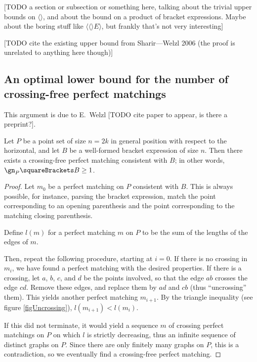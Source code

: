 \documentclass[10pt, a4paper, twoside]{basestyle}
\begin{document}
[TODO a section or subsection or something here, talking about the trivial upper bounds on $\langle\rangle$,
and about the bound on a product of bracket expressions. Maybe about the boring stuff like
$\langle\langle\rangle E \rangle$, but frankly that's not very interesting]

[TODO cite the existing upper bound from Sharir---Welzl 2006 (the proof is unrelated to anything here
though)]
\subsection{An optimal lower bound for the number of crossing-free perfect matchings}
This argument is due to E.~Welzl [TODO cite paper to appear, is there a preprint?].

\begin{theorem}
Let $P$ be a point set of size $n = 2k$ in general position with respect to the horizontal,
and let $B$ be a well-formed bracket expression of size $n$.
Then there exists a crossing-free perfect matching consistent with $B$; in other words,
$\gn_P\of B \geq 1$.
\begin{proof}
Let $m_0$ be a perfect matching on $P$ consistent with $B$. This is always possible, for instance,
parsing the bracket expression, match the point corresponding to an opening parenthesis
and the point corresponding to the matching closing parenthesis.

Define $l(m)$ for a perfect matching $m$ on $P$ to be the sum of the lengths of the edges of $m$.

Then, repeat the following procedure, starting at $i=0$.
If there is no crossing in $m_i$, we have found a perfect matching with the desired properties.
If there is a crossing, let $a$, $b$, $c$, and $d$ be the points involved, so that the edge
$ab$ crosses the edge $cd$. Remove these edges, and replace them by $ad$ and $cb$
(thus ``uncrossing'' them). This yields another perfect matching $m_{i+1}$. By the triangle
inequality (see figure \ref{figUncrossing}), $l(m_{i+1})<l(m_i)$.

If this did not terminate, it would yield a sequence $m$ of crossing perfect matchings on $P$ on
which $l$ is strictly decreasing, thus an infinite sequence of distinct graphs on $P$.
Since there are only finitely many graphs on $P$, this is a contradiction, so we eventually find a
crossing-free perfect matching.
\end{proof}
\end{theorem}
\end{document}
